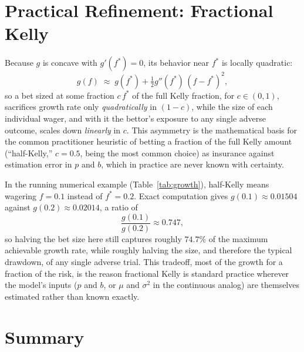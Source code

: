 \documentclass[11pt]{article}
\theoremstyle{remark}
\theoremstyle{definition}
\begin{document}
\section{Practical Refinement: Fractional Kelly}
\label{sec:fractional}

Because $g$ is concave with $g'(f^{*})=0$, its behavior near $f^*$ is locally quadratic:
\begin{equation}
g(f) \;\approx\; g(f^{*}) + \tfrac{1}{2}g''(f^{*})\,(f-f^{*})^2,
\label{eq:quadapprox}
\end{equation}
so a bet sized at some fraction $c\,f^{*}$ of the full Kelly fraction, for $c\in(0,1)$, sacrifices growth rate only \emph{quadratically} in $(1-c)$, while the size of each individual wager, and with it the bettor's exposure to any single adverse outcome, scales down \emph{linearly} in $c$. This asymmetry is the mathematical basis for the common practitioner heuristic of betting a fraction of the full Kelly amount (``half-Kelly,'' $c=0.5$, being the most common choice) as insurance against estimation error in $p$ and $b$, which in practice are never known with certainty.

In the running numerical example (Table~\ref{tab:growth}), half-Kelly means wagering $f=0.1$ instead of $f^{*}=0.2$. Exact computation gives $g(0.1) \approx 0.01504$ against $g(0.2)\approx0.02014$, a ratio of
\begin{equation}
\frac{g(0.1)}{g(0.2)} \approx 0.747,
\end{equation}
so halving the bet size here still captures roughly $74.7\%$ of the maximum achievable growth rate, while roughly halving the size, and therefore the typical drawdown, of any single adverse trial. This tradeoff, most of the growth for a fraction of the risk, is the reason fractional Kelly is standard practice wherever the model's inputs ($p$ and $b$, or $\mu$ and $\sigma^2$ in the continuous analog) are themselves estimated rather than known exactly.

\section{Summary}
\label{sec:summary}
\end{document}
